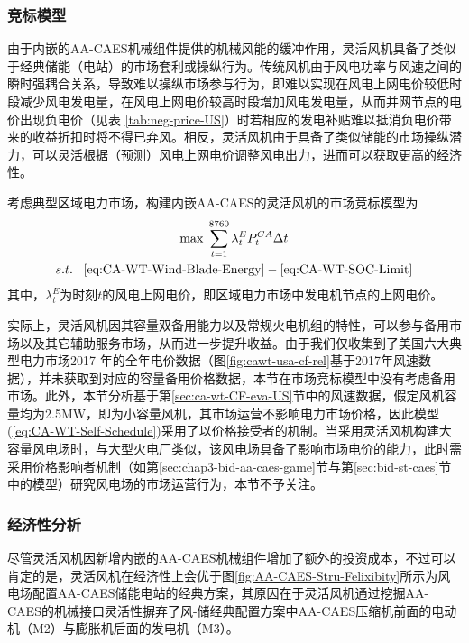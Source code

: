 \subsubsection{竞标模型}
由于内嵌的AA-CAES机械组件提供的机械风能的缓冲作用，灵活风机具备了类似于经典储能（电站）的市场套利或操纵行为。传统风机由于风电功率与风速之间的瞬时强耦合关系，导致难以操纵市场参与行为，即难以实现在风电上网电价较低时段减少风电发电量，在风电上网电价较高时段增加风电发电量，从而并网节点的电价出现负电价（见表
\ref{tab:neg-price-US}）时若相应的发电补贴难以抵消负电价带来的收益折扣时将不得已弃风。相反，灵活风机由于具备了类似储能的市场操纵潜力，可以灵活根据（预测）风电上网电价调整风电出力，进而可以获取更高的经济性。

考虑典型区域电力市场，构建内嵌AA-CAES的灵活风机的市场竞标模型为
\begin{subequations}
\label{eq:CA-WT-Self-Schedule}
\begin{gather}
\max \;\sum\limits_{t = 1}^{8760} {\lambda _t^EP_t^{CA}\Delta t} \label{eq:CA-WT-Self-Schedule-obj}\\
s.t.\;\;\;\eqref{eq:CA-WT-Wind-Blade-Energy} - \eqref{eq:CA-WT-SOC-Limit}
\end{gather}
\end{subequations}
其中，$\lambda_t^E$为时刻$t$的风电上网电价，即区域电力市场中发电机节点的上网电价。

实际上，灵活风机因其容量双备用能力以及常规火电机组的特性，可以参与备用市场以及其它辅助服务市场，从而进一步提升收益。由于我们仅收集到了美国六大典型电力市场2017 年的全年电价数据（图\ref{fig:cawt-usa-cf-rel}基于2017年风速数据），并未获取到对应的容量备用价格数据，本节在市场竞标模型中没有考虑备用市场。此外，本节分析基于第\ref{sec:ca-wt-CF-eva-US}节中的风速数据，假定风机容量均为2.5MW，即为小容量风机，其市场运营不影响电力市场价格，因此模型(\ref{eq:CA-WT-Self-Schedule})采用了以价格接受者的机制。当采用灵活风机构建大容量风电场时，与大型火电厂类似，该风电场具备了影响市场电价的能力，此时需采用价格影响者机制（如第\ref{sec:chap3-bid-aa-caes-game}节与第\ref{sec:bid-st-caes}节中的模型）研究风电场的市场运营行为，本节不予关注。

\subsubsection{经济性分析}
尽管灵活风机因新增内嵌的AA-CAES机械组件增加了额外的投资成本，不过可以肯定的是，灵活风机在经济性上会优于图\ref{fig:AA-CAES-Stru-Felixibity}所示为风电场配置AA-CAES储能电站的经典方案，其原因在于灵活风机通过挖掘AA-CAES的机械接口灵活性摒弃了风-储经典配置方案中AA-CAES压缩机前面的电动机（M2）与膨胀机后面的发电机（M3）。

